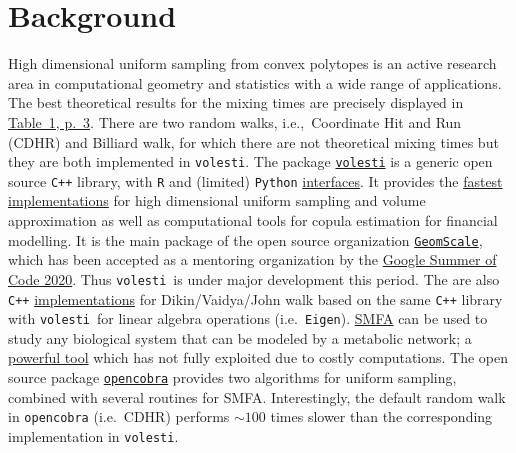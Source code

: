 \documentclass[a4paper, 12pt]{article}
\def\volesti{{\tt volesti}}
\begin{document}


\section{Background}
High dimensional uniform sampling from convex polytopes is an active research area in computational geometry and statistics with a wide range of applications.
The best theoretical results for the mixing times are precisely displayed in \textcolor{blue}{\href{https://arxiv.org/abs/1911.05656}{Table~1, p.~3}}. There are two random walks, i.e.,\ Coordinate Hit and Run (CDHR) and Billiard walk, for which there are not theoretical mixing times but they are both implemented in \volesti.
The package \textcolor{blue}{\href{https://github.com/GeomScale/volume_approximation}{\volesti}} is a generic open source {\tt C++} library, with {\tt R} and (limited) {\tt Python} \textcolor{blue}{\href{https://CRAN.R-project.org/package=volesti}{interfaces}}. It provides the \textcolor{blue}{\href{https://github.com/GeomScale/volume_approximation/wiki}{fastest implementations}} for high dimensional uniform sampling and volume approximation as well as computational tools for copula estimation for financial modelling. It is the main package of the open source organization \textcolor{blue}{\href{https://geomscale.github.io/}{{\tt GeomScale}}}, which has been accepted as a mentoring organization by the \textcolor{blue}{\href{https://summerofcode.withgoogle.com/organizations/5673184117915648/}{Google Summer of Code 2020}}. Thus \volesti\ is under major development this period. The are also {\tt C++} \textcolor{blue}{\href{https://github.com/rzrsk/vaidya-walk}{implementations}} for Dikin/Vaidya/John walk based on the same {\tt C++} library with \volesti\ for linear algebra operations (i.e.\ {\tt Eigen}). \textcolor{blue}{\href{https://www.ncbi.nlm.nih.gov/pubmed/12000313}{SMFA}} can be used to study any biological system that can be modeled by a metabolic network; a \textcolor{blue}{\href{https://www.ncbi.nlm.nih.gov/pmc/articles/PMC6718391/}{powerful tool}} which has not fully exploited due to costly computations. The open source package \textcolor{blue}{\href{https://opencobra.github.io/}{{\tt opencobra}}} provides two algorithms for uniform sampling, combined with several routines for SMFA. Interestingly, the default random walk in {\tt opencobra} (i.e.\ CDHR) performs $\sim 100$ times slower than the corresponding implementation in \volesti. 
\end{document}
